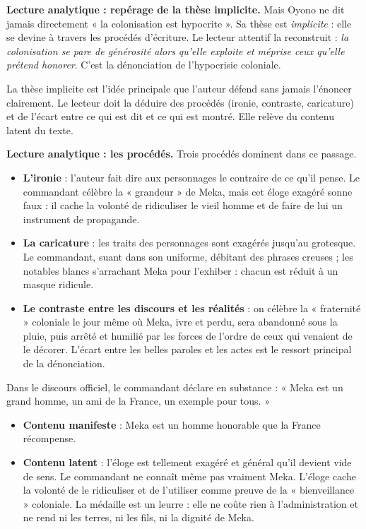 \documentclass[11pt]{article}
\newcommand{\cle}[1]{{\popxbold\color{popdark}#1}}
\begin{document}
\textbf{Lecture analytique : repérage de la thèse implicite.} Mais Oyono ne dit jamais directement « la colonisation est hypocrite ». Sa \cle{thèse} est \emph{implicite} : elle se devine à travers les procédés d'écriture. Le lecteur attentif la reconstruit : \emph{la colonisation se pare de générosité alors qu'elle exploite et méprise ceux qu'elle prétend honorer}. C'est la dénonciation de l'\cle{hypocrisie coloniale}.

\begin{definition}
La \cle{thèse implicite} est l'idée principale que l'auteur défend sans jamais l'énoncer clairement. Le lecteur doit la déduire des procédés (ironie, contraste, caricature) et de l'écart entre ce qui est dit et ce qui est montré. Elle relève du \cle{contenu latent} du texte.
\end{definition}

\textbf{Lecture analytique : les procédés.} Trois procédés dominent dans ce passage.

\begin{itemize}
\item \textbf{L'ironie} : l'auteur fait dire aux personnages le contraire de ce qu'il pense. Le commandant célèbre la « grandeur » de Meka, mais cet éloge exagéré sonne faux : il cache la volonté de ridiculiser le vieil homme et de faire de lui un instrument de propagande.
\item \textbf{La caricature} : les traits des personnages sont exagérés jusqu'au grotesque. Le commandant, suant dans son uniforme, débitant des phrases creuses ; les notables blancs s'arrachant Meka pour l'exhiber : chacun est réduit à un masque ridicule.
\item \textbf{Le contraste entre les discours et les réalités} : on célèbre la « fraternité » coloniale le jour même où Meka, ivre et perdu, sera abandonné sous la pluie, puis arrêté et humilié par les forces de l'ordre de ceux qui venaient de le décorer. L'écart entre les belles paroles et les actes est le ressort principal de la dénonciation.
\end{itemize}

\begin{exemplebox}
Dans le discours officiel, le commandant déclare en substance : « Meka est un grand homme, un ami de la France, un exemple pour tous. »
\begin{itemize}
\item \textbf{Contenu manifeste} : Meka est un homme honorable que la France récompense.
\item \textbf{Contenu latent} : l'éloge est tellement exagéré et général qu'il devient vide de sens. Le commandant ne connaît même pas vraiment Meka. L'éloge cache la volonté de le ridiculiser et de l'utiliser comme preuve de la « bienveillance » coloniale. La médaille est un leurre : elle ne coûte rien à l'administration et ne rend ni les terres, ni les fils, ni la dignité de Meka.
\end{itemize}
\end{exemplebox}
\end{document}
